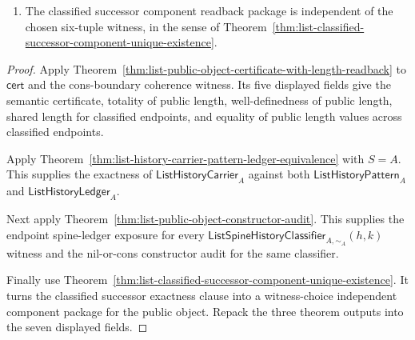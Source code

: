 \begin{theorem}
\begin{enumerate}
$$  \Longleftrightarrow
  \begin{array}{l}
  (\hsame(h,\emp)\land \hsame(k,\emp))\\
  \lor\\
  \exists a\,b\,t\,u\,p\,q:\mathsf{BHist}.\;
  \left(
  \begin{array}{l}
  A(a)\land A(b)\land
  \mathsf{ListHistoryCarrier}_A(t)\land
  \mathsf{ListHistoryCarrier}_A(u)\land\\
  \ContR(a,t,p)\land \ContR(b,u,q)\land
  \hsame(h,\Eone(p))\land \hsame(k,\Eone(q))\land\\
  \sim_A(a,b)\land
  \mathsf{ListSpineHistoryClassifier}_{A,\sim_A}(t,u)
  \end{array}
  \right).
  \end{array}
  $$
  \item
  The classified successor component readback package is independent of the
  chosen six-tuple witness, in the sense of
  Theorem~\ref{thm:list-classified-successor-component-unique-existence}.
\end{enumerate}
\end{theorem}
\begin{proof}
Apply Theorem~\ref{thm:list-public-object-certificate-with-length-readback} to
$\mathsf{cert}$ and the cons-boundary coherence witness. Its five displayed
fields give the semantic certificate, totality of public length, well-definedness
of public length, shared length for classified endpoints, and equality of public
length values across classified endpoints.

Apply Theorem~\ref{thm:list-history-carrier-pattern-ledger-equivalence} with
$S=A$. This supplies the exactness of $\mathsf{ListHistoryCarrier}_A$ against
both $\mathsf{ListHistoryPattern}_A$ and $\mathsf{ListHistoryLedger}_A$.

Next apply Theorem~\ref{thm:list-public-object-constructor-audit}. This supplies
the endpoint spine-ledger exposure for every
$\mathsf{ListSpineHistoryClassifier}_{A,\sim_A}(h,k)$ witness and the nil-or-cons
constructor audit for the same classifier.

Finally use
Theorem~\ref{thm:list-classified-successor-component-unique-existence}. It
turns the classified successor exactness clause into a witness-choice
independent component package for the public object. Repack the three theorem
outputs into the seven displayed fields.
\end{proof}

